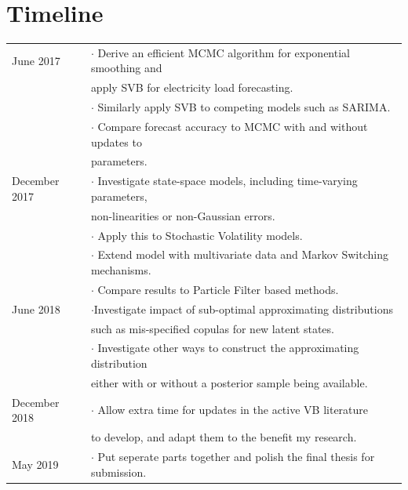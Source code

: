 \documentclass[12pt,a4paper]{article}%
\numberwithin{equation}{section}
\begin{document}
\section{Timeline} \label{sec:Timeline}

\begin{tabular}{|l|l|}
\hline
  June 2017 & $\cdot$ Derive an efficient MCMC algorithm for exponential smoothing and \\
  & apply SVB for electricity load forecasting. \\
  & $\cdot$ Similarly apply SVB to competing models such as SARIMA. \\
  & $\cdot$ Compare forecast accuracy to MCMC with and without updates to \\
  & parameters. \\ \hline
  December 2017 & $\cdot$ Investigate state-space models, including time-varying parameters, \\
  & non-linearities or non-Gaussian errors. \\
  & $\cdot$ Apply this to Stochastic Volatility models. \\
  & $\cdot$ Extend model with multivariate data and Markov Switching mechanisms.\\
  & $\cdot$ Compare results to Particle Filter based methods. \\  \hline
  June 2018 & $\cdot$Investigate impact of sub-optimal approximating distributions  \\
  & such as mis-specified copulas for new latent states. \\
  & $\cdot$ Investigate other ways to construct the approximating distribution  \\
  & either with or without a posterior sample being available. \\  \hline
  December 2018 & $\cdot$ Allow extra time for updates in the active VB literature  \\
  & to develop, and adapt them to the benefit my research. \\  \hline
  May 2019 & $\cdot$ Put seperate parts together and polish the final thesis for submission. \\
\hline
\end{tabular}



\end{document}

